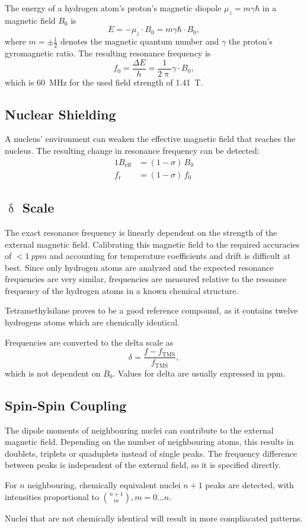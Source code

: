 The energy of a hydrogen atom's proton's magnetic diopole $\mu_z = m \gamma \hbar$ in a magnetic field $B_0$ is
\begin{equation*}
	E = - \mu_z \cdot B_0 = m \gamma \hbar \cdot B_0,
\end{equation*}
where $m = \pm \tfrac{1}{2}$ denotes the magnetic quantum number and $\gamma$ the proton's gyromagnetic ratio.
The resulting resonance frequency is
\begin{equation*}
	f_0 = \frac{\Delta E}{h} = \frac{1}{2 \uppi} \gamma \cdot B_0,
\end{equation*}
which is \SI{60}{\mega\hertz} for the used field strength of \SI{1.41}{\tesla}.

\subsection{Nuclear Shielding}
A nucleus' environment can weaken the effective magnetic field that reaches the nucleus.
The resulting change in resonance frequency can be detected:
\begin{alignat*}{1}
	B_\text{eff} &= \left(1 - \sigma \right) \, B_0\\
	f_\text{r} &= \left(1 - \sigma \right) \, f_0
\end{alignat*}

\subsection{$\updelta$ Scale}
The exact resonance frequency is linearly dependent on the strength of the external magnetic field.
Calibrating this magnetic field to the required accuracies of $< \SI{1}{ppm}$ and accounting for temperature coefficients and drift is difficult at best.
Since only hydrogen atoms are analyzed and the expected resonance frequencies are very similar, frequencies are measured relative to the resoance frequency of the hydrogen atoms in a known chemical structure.

Tetramethylsilane proves to be a good reference compound, as it contains twelve hydrogens atoms which are chemically identical.

Frequencies are converted to the delta scale as
\begin{equation*}
	\delta = \frac{f - f_\text{TMS}}{f_\text{TMS}},
\end{equation*}
which is not dependent on $B_0$.
Values for delta are usually expressed in \si{ppm}.

\subsection{Spin-Spin Coupling}
The dipole moments of neighbouring nuclei can contribute to the external magnetic field.
Depending on the number of neighbouring atoms, this results in doublets, triplets or quaduplets instead of single peaks.
The frequency difference between peaks is independent of the external field, so it is specified directly.

For $n$ neighbouring, chemically equivalent nuclei $n + 1$ peaks are detected, with intensities proportional to ${{n + 1}\choose{m}}, m = 0 \dots n$.

Nuclei that are not chemically identical will result in more compliacated patterns.
